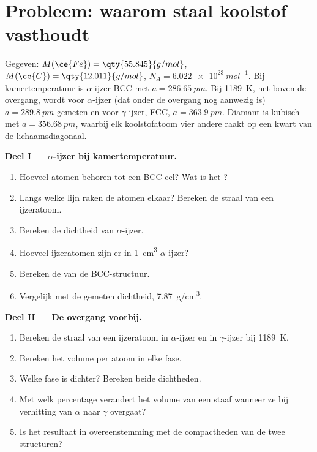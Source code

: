 \section{Probleem: waarom staal koolstof vasthoudt}

\begin{problem}
\label{pb:b1:crystals-metals:1}
Gegeven: $M(\ce{Fe}) = \qty{55.845}{g/mol}$, $M(\ce{C}) = \qty{12.011}{g/mol}$,
$N_A = \qty{6.022e23}{mol^{-1}}$. Bij kamertemperatuur is $\alpha$-ijzer
BCC met $a = \qty{286.65}{pm}$. Bij \qty{1189}{K}, net boven de overgang,
wordt voor $\alpha$-ijzer (dat onder de overgang nog aanwezig is)
$a = \qty{289.8}{pm}$ gemeten en voor $\gamma$-ijzer, FCC,
$a = \qty{363.9}{pm}$. Diamant is kubisch met $a = \qty{356.68}{pm}$,
waarbij elk koolstofatoom vier andere raakt op een kwart van de
lichaamsdiagonaal.

\medskip
\noindent\textbf{Deel I --- $\alpha$-ijzer bij kamertemperatuur.}
\begin{enumerate}
  \item Hoeveel atomen behoren tot een BCC-cel? Wat is het
        ?
  \item Langs welke lijn raken de atomen elkaar? Bereken de straal van
        een ijzeratoom.
  \item Bereken de dichtheid van $\alpha$-ijzer.
  \item Hoeveel ijzeratomen zijn er in \qty{1}{cm^3} $\alpha$-ijzer?
  \item Bereken de  van de BCC-structuur.
  \item Vergelijk met de gemeten dichtheid, \qty{7.87}{g/cm^3}.
\end{enumerate}

\medskip
\noindent\textbf{Deel II --- De overgang voorbij.}
\begin{enumerate}[resume]
  \item Bereken de straal van een ijzeratoom in $\alpha$-ijzer en in
        $\gamma$-ijzer bij \qty{1189}{K}.
  \item Bereken het volume per atoom in elke fase.
  \item Welke fase is dichter? Bereken beide dichtheden.
  \item Met welk percentage verandert het volume van een staaf wanneer ze
        bij verhitting van $\alpha$ naar $\gamma$ overgaat?
  \item Is het resultaat in overeenstemming met de compactheden van de
        twee structuren?
\end{enumerate}


\end{problem}
